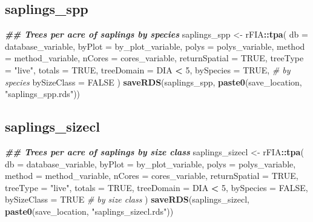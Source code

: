 \documentclass[
]{book}
\newenvironment{Shaded}{\begin{snugshade}}{\end{snugshade}}
\newcommand{\AttributeTok}[1]{\textcolor[rgb]{0.13,0.29,0.53}{#1}}
\newcommand{\CommentTok}[1]{\textcolor[rgb]{0.56,0.35,0.01}{\textit{#1}}}
\newcommand{\ConstantTok}[1]{\textcolor[rgb]{0.56,0.35,0.01}{#1}}
\newcommand{\DecValTok}[1]{\textcolor[rgb]{0.00,0.00,0.81}{#1}}
\newcommand{\DocumentationTok}[1]{\textcolor[rgb]{0.56,0.35,0.01}{\textbf{\textit{#1}}}}
\newcommand{\FunctionTok}[1]{\textcolor[rgb]{0.13,0.29,0.53}{\textbf{#1}}}
\newcommand{\NormalTok}[1]{#1}
\newcommand{\OtherTok}[1]{\textcolor[rgb]{0.56,0.35,0.01}{#1}}
\newcommand{\SpecialCharTok}[1]{\textcolor[rgb]{0.81,0.36,0.00}{\textbf{#1}}}
\newcommand{\StringTok}[1]{\textcolor[rgb]{0.31,0.60,0.02}{#1}}
\begin{document}
\hypertarget{saplings_spp}{%
\subsection{saplings\_spp}\label{saplings_spp}}

\begin{Shaded}
\begin{Highlighting}[]
\DocumentationTok{\#\# Trees per acre of saplings by species }
\NormalTok{saplings\_spp }\OtherTok{\textless{}{-}}\NormalTok{ rFIA}\SpecialCharTok{::}\FunctionTok{tpa}\NormalTok{(}
  \AttributeTok{db =}\NormalTok{ database\_variable,}
  \AttributeTok{byPlot =}\NormalTok{ by\_plot\_variable,}
  \AttributeTok{polys =}\NormalTok{ polys\_variable,}
  \AttributeTok{method =}\NormalTok{ method\_variable,}
  \AttributeTok{nCores =}\NormalTok{ cores\_variable,}
  \AttributeTok{returnSpatial =} \ConstantTok{TRUE}\NormalTok{,}
  \AttributeTok{treeType =} \StringTok{"live"}\NormalTok{,}
  \AttributeTok{totals =} \ConstantTok{TRUE}\NormalTok{,}
  \AttributeTok{treeDomain =}\NormalTok{ DIA }\SpecialCharTok{\textless{}} \DecValTok{5}\NormalTok{,}
  \AttributeTok{bySpecies =} \ConstantTok{TRUE}\NormalTok{, }\CommentTok{\# by species}
  \AttributeTok{bySizeClass =} \ConstantTok{FALSE}
\NormalTok{) }
\FunctionTok{saveRDS}\NormalTok{(saplings\_spp, }\FunctionTok{paste0}\NormalTok{(save\_location, }\StringTok{"saplings\_spp.rds"}\NormalTok{))}
\end{Highlighting}
\end{Shaded}

\hypertarget{saplings_sizecl}{%
\subsection{saplings\_sizecl}\label{saplings_sizecl}}

\begin{Shaded}
\begin{Highlighting}[]
\DocumentationTok{\#\# Trees per acre of saplings by size class }
\NormalTok{saplings\_sizecl }\OtherTok{\textless{}{-}}\NormalTok{ rFIA}\SpecialCharTok{::}\FunctionTok{tpa}\NormalTok{(}
  \AttributeTok{db =}\NormalTok{ database\_variable,}
  \AttributeTok{byPlot =}\NormalTok{ by\_plot\_variable,}
  \AttributeTok{polys =}\NormalTok{ polys\_variable,}
  \AttributeTok{method =}\NormalTok{ method\_variable,}
  \AttributeTok{nCores =}\NormalTok{ cores\_variable,}
  \AttributeTok{returnSpatial =} \ConstantTok{TRUE}\NormalTok{,}
  \AttributeTok{treeType =} \StringTok{"live"}\NormalTok{,}
  \AttributeTok{totals =} \ConstantTok{TRUE}\NormalTok{,}
  \AttributeTok{treeDomain =}\NormalTok{ DIA }\SpecialCharTok{\textless{}} \DecValTok{5}\NormalTok{,}
  \AttributeTok{bySpecies =} \ConstantTok{FALSE}\NormalTok{,}
  \AttributeTok{bySizeClass =} \ConstantTok{TRUE} \CommentTok{\# by size class}
\NormalTok{) }
\FunctionTok{saveRDS}\NormalTok{(saplings\_sizecl, }\FunctionTok{paste0}\NormalTok{(save\_location, }\StringTok{"saplings\_sizecl.rds"}\NormalTok{))}
\end{Highlighting}
\end{Shaded}
\end{document}
